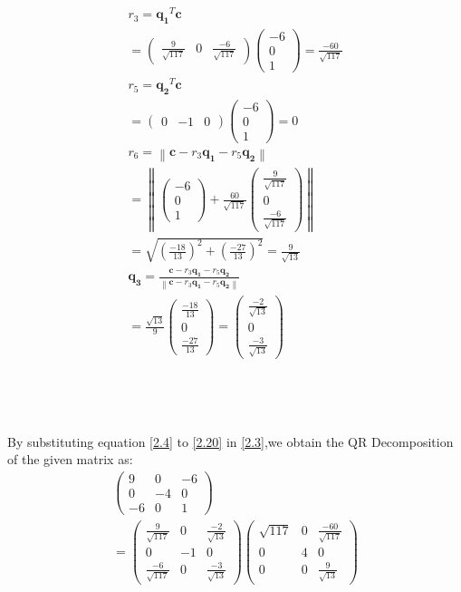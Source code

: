 \documentclass[journal,12pt,twocolumn]{IEEEtran}
\let\vec\mathbf
\numberwithin{equation}{subsection}
\newcommand{\myvec}[1]{\ensuremath{\begin{pmatrix}#1\end{pmatrix}}}
\newcommand{\norm}[1]{\left\lVert#1\right\rVert}
\begin{document}
\begin{align}
r_3 = \vec{q_1}^T\vec{c}\\
= \myvec{\frac{9}{\sqrt{117}}&0& \frac{-6}{\sqrt{117}}}\myvec{-6\\0\\1} = \frac{-60}{\sqrt{117}}\\
r_5 = \vec{q_2}^T\vec{c}\\
=\myvec{0&-1&0}\myvec{-6\\0\\1} = 0\\
r_6 = \norm{\vec{c} - r_3  \vec{q_1} -r_5\vec{q_2}}\\
=\norm{\myvec{-6\\0\\1}+ \frac{60}{\sqrt{117}}\myvec{\frac{9}{\sqrt{117}}\\0\\ \frac{-6}{\sqrt{117}}}}\\
=\sqrt{\left(\frac{-18}{13}\right)^2 + \left(\frac{-27}{13}\right)^2 }=\frac{9}{\sqrt{13}}\\
\vec{q_3} = \frac{\vec{c} - r_3  \vec{q_1} -r_5\vec{q_2}}{ \norm{\vec{c} - r_3  \vec{q_1} -r_5\vec{q_2}}}\\
= \frac{\sqrt{13}}{9}\myvec{\frac{-18}{13}\\0\\ \frac{-27}{13}}= \myvec{\frac{-2}{\sqrt{13}}\\0\\ \frac{-3}{\sqrt{13}}} \label{2.20}
\end{align}
\\
\\
\\
\\
By substituting equation  \eqref{2.4} to  \eqref{2.20} in  \eqref{2.3},we obtain
the QR Decomposition of the given matrix as:
\begin{multline}
    \myvec{9&0&-6\\0&-4&0\\-6&0&1}  \\= \myvec{\frac{9}{\sqrt{117}}&0& \frac{-2}{\sqrt{13}}\\0&-1&0\\ \frac{-6}{\sqrt{117}}&0&\frac{-3}{\sqrt{13}}}\myvec{\sqrt{117} &0&\frac{-60}{\sqrt{117}}\\0&4&0 \\0&0&\frac{9}{\sqrt{13}}}
\end{multline}
\end{document}
